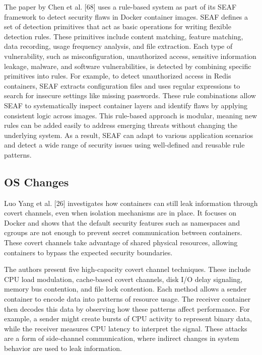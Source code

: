 \documentclass[12pt]{report}
\begin{document}
\begin{doublespace}
The paper by Chen et al. [68] uses a rule-based system as part of its SEAF framework to detect security flaws in Docker container images. SEAF defines a set of detection primitives that act as basic operations for writing flexible detection rules. These primitives include content matching, feature matching, data recording, usage frequency analysis, and file extraction. Each type of vulnerability, such as misconfiguration, unauthorized access, sensitive information leakage, malware, and software vulnerabilities, is detected by combining specific primitives into rules. For example, to detect unauthorized access in Redis containers, SEAF extracts configuration files and uses regular expressions to search for insecure settings like missing passwords. These rule combinations allow SEAF to systematically inspect container layers and identify flaws by applying consistent logic across images. This rule-based approach is modular, meaning new rules can be added easily to address emerging threats without changing the underlying system. As a result, SEAF can adapt to various application scenarios and detect a wide range of security issues using well-defined and reusable rule patterns.

\subsection{OS Changes}

Luo Yang et al. [26] investigates how containers can still leak information through covert channels, even when isolation mechanisms are in place. It focuses on Docker and shows that the default security features such as namespaces and cgroups are not enough to prevent secret communication between containers. These covert channels take advantage of shared physical resources, allowing containers to bypass the expected security boundaries.

The authors present five high-capacity covert channel techniques. These include CPU load modulation, cache-based covert channels, disk I/O delay signaling, memory bus contention, and file lock contention. Each method allows a sender container to encode data into patterns of resource usage. The receiver container then decodes this data by observing how these patterns affect performance. For example, a sender might create bursts of CPU activity to represent binary data, while the receiver measures CPU latency to interpret the signal. These attacks are a form of side-channel communication, where indirect changes in system behavior are used to leak information.


\end{doublespace}
\end{document}
